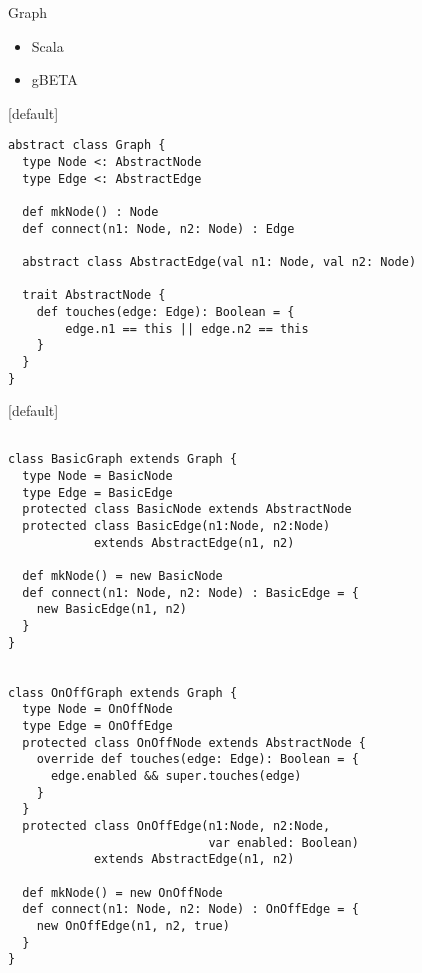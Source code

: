 \documentclass{beamer}
\makeatletter
\newenvironment{withoutheadline}{
        \setbeamertemplate{headline}[default]
        \def\beamer@entrycode{\vspace*{-\headheight}}
    }{}
\makeatother
\begin{document}
\begin{frame}
\centering
Graph
\begin{itemize}
  \item Scala
  \item gBETA
\end{itemize}
\end{frame}

\begin{withoutheadline}
\begin{frame}[fragile]{}
\centering
\begin{verbatim}
abstract class Graph {
  type Node <: AbstractNode
  type Edge <: AbstractEdge

  def mkNode() : Node
  def connect(n1: Node, n2: Node) : Edge

  abstract class AbstractEdge(val n1: Node, val n2: Node)

  trait AbstractNode {
    def touches(edge: Edge): Boolean = {
        edge.n1 == this || edge.n2 == this
    }
  }
}
\end{verbatim}
\end{frame}
\end{withoutheadline}


\begin{withoutheadline}
\begin{frame}[fragile]{}
\centering
\begin{verbatim}

class BasicGraph extends Graph {
  type Node = BasicNode
  type Edge = BasicEdge
  protected class BasicNode extends AbstractNode
  protected class BasicEdge(n1:Node, n2:Node)
            extends AbstractEdge(n1, n2)

  def mkNode() = new BasicNode
  def connect(n1: Node, n2: Node) : BasicEdge = {
    new BasicEdge(n1, n2)
  }
}


class OnOffGraph extends Graph {
  type Node = OnOffNode
  type Edge = OnOffEdge
  protected class OnOffNode extends AbstractNode {
    override def touches(edge: Edge): Boolean = {
      edge.enabled && super.touches(edge)
    }
  }
  protected class OnOffEdge(n1:Node, n2:Node,
                            var enabled: Boolean)
            extends AbstractEdge(n1, n2)

  def mkNode() = new OnOffNode
  def connect(n1: Node, n2: Node) : OnOffEdge = {
    new OnOffEdge(n1, n2, true)
  }
}
\end{verbatim}
\end{frame}
\end{withoutheadline}
\end{document}
